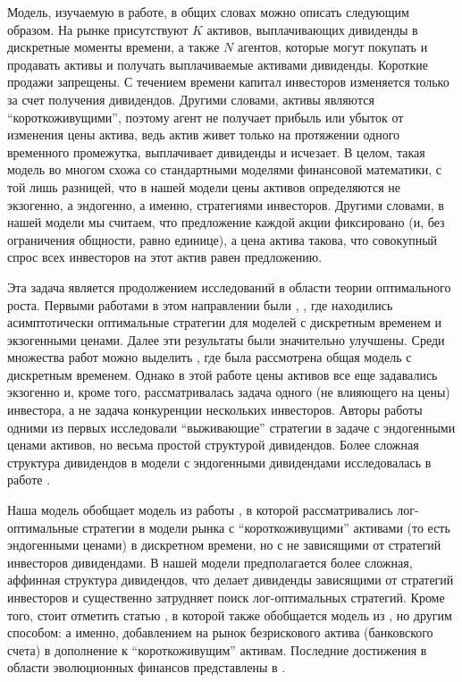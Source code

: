 \documentclass[a4paper,12pt,russian]{article} %
\theoremstyle{definition}
\begin{document}
Модель, изучаемую в работе, в общих словах можно описать следующим образом. На рынке присутствуют $K$ активов, выплачивающих дивиденды в дискретные моменты времени, а также $N$ агентов, которые могут покупать и продавать активы и получать выплачиваемые активами дивиденды. Короткие продажи запрещены. С течением времени капитал инвесторов изменяется только за счет получения дивидендов. Другими словами, активы являются ``короткоживущими'', поэтому агент не получает прибыль или убыток от изменения цены актива, ведь актив живет только на протяжении одного временного промежутка, выплачивает дивиденды и исчезает. В целом, такая модель во многом схожа со стандартными моделями финансовой математики, с той лишь разницей, что в нашей модели цены активов определяются не экзогенно, а эндогенно, а именно, стратегиями инвесторов. Другими словами, в нашей модели мы считаем, что предложение каждой акции фиксировано (и, без ограничения общности, равно единице), а цена актива такова, что совокупный спрос всех инвесторов на этот актив равен предложению. 

Эта задача является продолжением исследований в области теории оптимального роста. Первыми работами в этом направлении были \cite{Kelly1956}, \cite{Breiman1961}, где находились асимптотически оптимальные стратегии для моделей с дискретным временем и экзогенными ценами. Далее эти результаты были значительно улучшены. Среди множества работ можно выделить \cite{AlgoetCover1988}, где была рассмотрена общая модель с дискретным временем. Однако в этой работе цены активов все еще задавались экзогенно и, кроме того, рассматривалась задача одного (не влияющего на цены) инвестора, а не задача конкуренции нескольких инвесторов. Авторы работы \cite{BlumeEasley1992} одними из первых исследовали ``выживающие'' стратегии в задаче с эндогенными ценами активов, но весьма простой структурой дивидендов. Более сложная структура дивидендов в модели с эндогенными дивидендами исследовалась в работе \cite{Amir2013}.

Наша модель обобщает модель из работы \cite{Amir2013}, в которой рассматривались 
лог-оптимальные стратегии в модели рынка с ``короткоживущими'' активами 
(то есть эндогенными ценами) в дискретном времени, но с не зависящими от стратегий инвесторов дивидендами. В нашей модели предполагается более сложная, аффинная структура дивидендов, что делает дивиденды зависящими от стратегий инвесторов и существенно затрудняет поиск лог-оптимальных стратегий. Кроме того, стоит отметить статью \cite{DrokinZhitlukhin2020}, в которой также обобщается модель из \cite{Amir2013}, но другим способом: а именно, добавлением на рынок безрискового актива (банковского счета) в дополнение к ``короткоживущим'' активам. Последние достижения в области эволюционных финансов представлены в \cite{EvstigneevEvolFinance2016}.
\end{document}
